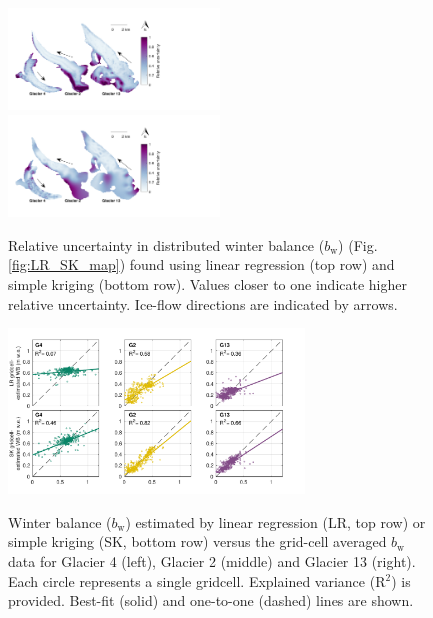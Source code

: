 \documentclass[twocolumn, letterpaper]{igs}
\begin{document}
\begin{figure}
	\centering
	\includegraphics[width =0.5\textwidth]{SpatialVar_LR.pdf}\\
	\includegraphics[width =0.5\textwidth]{SpatialVar_SK.pdf}\\
	\caption{Relative uncertainty in distributed winter balance ($b_\mathrm{w}$) (Fig. \ref{fig:LR_SK_map}) found using linear regression (top row) and simple kriging (bottom row). Values closer to one indicate higher relative uncertainty. Ice-flow directions are indicated by arrows.}
	\label{fig:WSMBspatialvar}
\end{figure}

\begin{figure}
	\centering
	\includegraphics[width =0.7\textwidth]{observedVSestimated_S2.pdf}\\
	\caption{Winter balance ($b_\mathrm{w}$) estimated by linear regression (LR, top row) or simple kriging (SK, bottom row) versus the grid-cell averaged $b_\mathrm{w}$ data for Glacier 4 (left), Glacier 2 (middle) and Glacier 13 (right). Each circle represents a single gridcell. Explained variance (R$^2$) is provided. Best-fit (solid) and one-to-one (dashed) lines are shown.}
	\label{fig:observedVSestimated_S2}
\end{figure}
\end{document}
